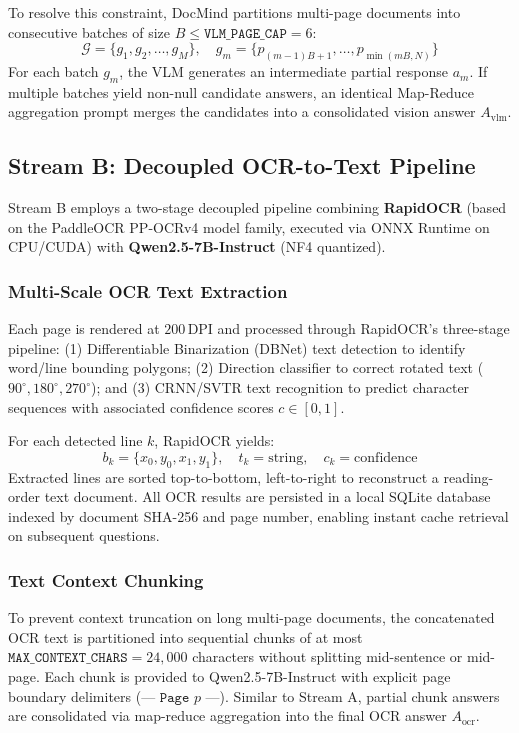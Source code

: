 \documentclass[conference]{IEEEtran}
\begin{document}
To resolve this constraint, DocMind partitions multi-page documents into consecutive batches of size $B \le \texttt{VLM\_PAGE\_CAP} = 6$:
\begin{equation}
    \mathcal{G} = \{g_1, g_2, \dots, g_M\}, \quad g_m = \{p_{(m-1)B + 1}, \dots, p_{\min(mB, N)}\}
    \label{eq:batches}
\end{equation}
For each batch $g_m$, the VLM generates an intermediate partial response $a_m$. If multiple batches yield non-null candidate answers, an identical Map-Reduce aggregation prompt merges the candidates into a consolidated vision answer $A_{\text{vlm}}$.

\subsection{Stream B: Decoupled OCR-to-Text Pipeline}
Stream B employs a two-stage decoupled pipeline combining \textbf{RapidOCR} (based on the PaddleOCR PP-OCRv4 model family, executed via ONNX Runtime on CPU/CUDA) with \textbf{Qwen2.5-7B-Instruct} (NF4 quantized).

\subsubsection{Multi-Scale OCR Text Extraction}
Each page is rendered at $200$\,DPI and processed through RapidOCR's three-stage pipeline: (1) Differentiable Binarization (DBNet) text detection to identify word/line bounding polygons; (2) Direction classifier to correct rotated text ($90^\circ, 180^\circ, 270^\circ$); and (3) CRNN/SVTR text recognition to predict character sequences with associated confidence scores $c \in [0, 1]$.

For each detected line $k$, RapidOCR yields:
\begin{equation}
    b_k = \{x_0, y_0, x_1, y_1\}, \quad t_k = \text{string}, \quad c_k = \text{confidence}
    \label{eq:ocr_box}
\end{equation}
Extracted lines are sorted top-to-bottom, left-to-right to reconstruct a reading-order text document. All OCR results are persisted in a local SQLite database indexed by document SHA-256 and page number, enabling instant cache retrieval on subsequent questions.

\subsubsection{Text Context Chunking}
To prevent context truncation on long multi-page documents, the concatenated OCR text is partitioned into sequential chunks of at most $\texttt{MAX\_CONTEXT\_CHARS} = 24,000$ characters without splitting mid-sentence or mid-page. Each chunk is provided to Qwen2.5-7B-Instruct with explicit page boundary delimiters ($\texttt{--- Page } p \texttt{ ---}$). Similar to Stream A, partial chunk answers are consolidated via map-reduce aggregation into the final OCR answer $A_{\text{ocr}}$.
\end{document}
